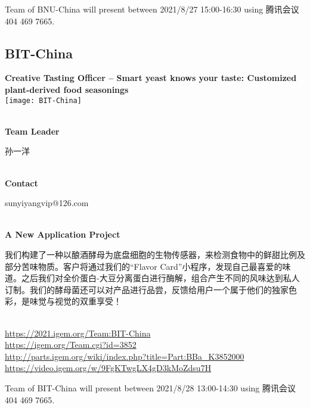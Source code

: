 \vfill{}









Team of BNU-China will present between  2021/8/27 15:00-16:30       using 腾讯会议 404 469 7665.
\newpage


\subsection{\textcolor{Blu}{ BIT-China } }
\vspace{5mm}
\begin{center}
\large{
  \textbf{ Creative Tasting Officer -- Smart yeast knows your taste: Customized plant-derived food seasonings }\\
  \texttt{[image: BIT-China]}
}
\end{center}
\textbf{\\Team Leader}

  孙一洋


\textbf{\\Contact}

  sunyiyangvip@126.com


\textbf{\\A New Application Project\\}\begin{spacing}{1.5}

我们构建了一种以酿酒酵母为底盘细胞的生物传感器，来检测食物中的鲜甜比例及部分苦味物质。客户将通过我们的“Flavor Card”小程序，发现自己最喜爱的味道。之后我们对全价蛋白-大豆分离蛋白进行酶解，组合产生不同的风味达到私人订制。我们的酵母菌还可以对产品进行品尝，反馈给用户一个属于他们的独家色彩，是味觉与视觉的双重享受！\end{spacing}
\\

\url{https://2021.igem.org/Team:BIT-China }\\
\url{https://igem.org/Team.cgi?id=3852 }\\
\url{http://parts.igem.org/wiki/index.php?title=Part:BBa_K3852000 }\\
\url{https://video.igem.org/w/9FgKTwgLX4gD3kMoZdsu7H }\\

\vfill{}









Team of BIT-China will present between      2021/8/28 13:00-14:30   using 腾讯会议 404 469 7665.
\newpage


